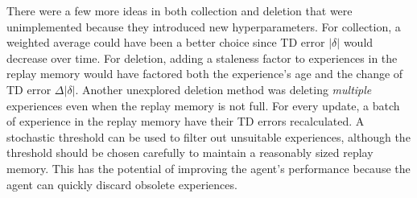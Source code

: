 \documentclass{article} %
\begin{document}
There were a few more ideas in both collection and deletion that were unimplemented because they introduced new hyperparameters. For collection, a weighted average could have been a better choice since TD error $\lvert \delta \rvert$ would decrease over time. For deletion, adding a staleness factor to experiences in the replay memory would have factored both the experience's age and the change of TD error $\Delta \lvert \delta \rvert$. Another unexplored deletion method was deleting \textit{multiple} experiences even when the replay memory is not full. For every update, a batch of experience in the replay memory have their TD errors recalculated. A stochastic threshold can be used to filter out unsuitable experiences, although the threshold should be chosen carefully to maintain a reasonably sized replay memory. This has the potential of improving the agent's performance because the agent can quickly discard obsolete experiences.







\clearpage
\end{document}
